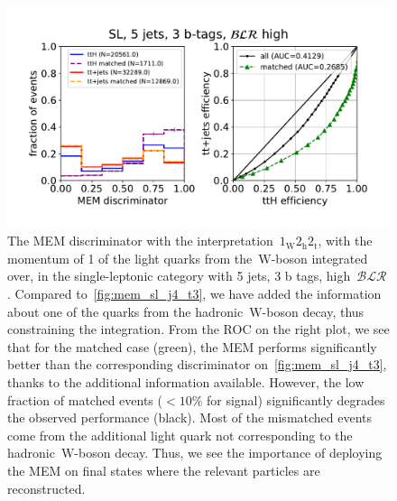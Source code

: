 \begin{figure}
\begin{centering}
\includegraphics[width = 1.0\textwidth]{figures/mem_sl_j5_t3_blrH.pdf}
\caption[The MEM discriminator with the~$1_{\mathrm{W}} 2_{\mathrm{h}} 2_{\mathrm{t}}$ interpretation in the 5 jet, 3 b-tags, high~$\mathcal{BLR}$ category]{The MEM discriminator with the interpretation~$1_{\mathrm{W}} 2_{\mathrm{h}} 2_{\mathrm{t}}$, with the momentum of 1 of the light quarks from the~$\mathrm{W}$-boson integrated over, in the single-leptonic category with 5 jets, 3 b tags, high~$\mathcal{BLR}$. Compared to~\cref{fig:mem_sl_j4_t3}, we have added the information about one of the quarks from the hadronic~$\mathrm{W}$-boson decay, thus constraining the integration. From the ROC on the right plot, we see that for the matched case (green), the MEM performs significantly better than the corresponding discriminator on~\cref{fig:mem_sl_j4_t3}, thanks to the additional information available. However, the low fraction of matched events ($< 10\%$ for signal) significantly degrades the observed performance (black). Most of the mismatched events come from the additional light quark not corresponding to the hadronic~$\mathrm{W}$-boson decay. Thus, we see the importance of deploying the MEM on final states where the relevant particles are reconstructed.}
\label{fig:mem_sl_j5_t3}
\end{centering}
\end{figure}

